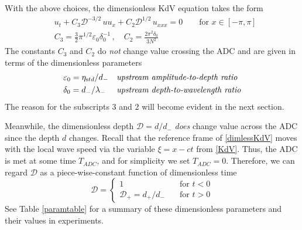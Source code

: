 \documentclass[11pt]{article}
\newcommand{\eps}{\varepsilon}
\newcommand{\etastd}{\eta_{\text std}}
\newcommand{\depth}{d}
\newcommand{\dup}{\depth_{-}}
\newcommand{\ddn}{\depth_{+}}
\newcommand{\lam}{\lambda}
\newcommand{\lamup}{\lam_{-}}
\newcommand{\lamfac}{N}
\newcommand{\drat}{\mathcal{D}}
\newcommand{\dratdn}{\drat_+}
\newcommand{\epsup}{\eps_0}
\newcommand{\delup}{\delta_0}
\begin{document}
With the above choices, the dimensionless KdV equation takes the form
\begin{align}
\label{dimlessKdV}
&u_t + C_3 \drat^{-3/2} \, u u_x + C_2 \drat^{1/2} \, u_{xxx} = 0
\qquad \text{for } x \in [-\pi,\pi] \\
\label{C3C2}
&C_3 = \frac{3}{2} \pi^{1/2} \epsup \delup^{-1} \, , \quad
C_2 = \frac{2 \pi^2 \delup}{3 \lamfac^2} 
\end{align}
The constants $C_3$ and $C_2$ do {\em not} change value crossing the ADC and are given in terms of the dimensionless parameters
\begin{align}
&\epsup = \etastd / \dup
&&\mbox{\em upstream amplitude-to-depth ratio} \\
&\delup = \dup / \lamup
&&\mbox{\em upstream depth-to-wavelength ratio}
\end{align}
The reason for the subscripts $3$ and $2$ will become evident in the next section. 

Meanwhile, the dimensionless depth $\drat = {\depth}/{\dup}$ {\em does} change value across the ADC since the depth $\depth$ changes. Recall that the reference frame of \eqref{dimlessKdV} moves with the local wave speed via the variable $\xi = x-ct$ from \eqref{KdV}. Thus, the ADC is met at some time $T_{ADC}$, and for simplicity we set $T_{ADC} = 0$. Therefore, we can regard $\drat$ as a piece-wise-constant function of dimensionless time
\begin{equation}
\label{dratpw}
\drat = 
\begin{cases}
1 		&\quad \mbox{for } {t}<0 \\
\dratdn = {\ddn}/{\dup} 	&\quad \mbox{for } {t}>0
\end{cases}
\end{equation}
See Table \ref{paramtable} for a summary of these dimensionless parameters and their values in experiments.
\end{document}
